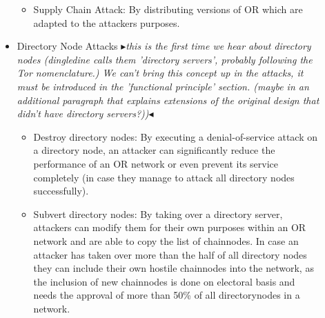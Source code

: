 \documentclass{sig-alternate}
\newcommand{\boxedtext}[1]{\fbox{\scriptsize\bfseries\textsf{#1}}}
\newcommand{\nota}[2]{
   \boxedtext{#1}
       {\small$\blacktriangleright$\emph{\textsl{#2}}$\blacktriangleleft$}
}
\newcommand\fk[1]{\nota{FK}{#1}}
\begin{document}
\begin{description}
\begin{itemize}
\begin{itemize}
			\item Supply Chain Attack: By distributing versions of OR which are adapted to the attackers purposes. 
		\end{itemize}
		\item Directory Node Attacks\fk{this is the first time we hear about directory nodes (dingledine calls them 'directory servers', probably following the Tor nomenclature.) We can't bring this concept up in the attacks, it must be introduced in the 'functional principle' section. (maybe in an additional paragraph that explains extensions of the original design that didn't have directory servers?))}
			\begin{itemize} \itemsep0pt 
			\item Destroy directory nodes: By executing a denial-of-service attack on a directory node, an attacker can significantly reduce the performance of an OR network or even prevent its service completely (in case they manage to attack all directory nodes successfully).
			\item Subvert directory nodes: By taking over a directory server, attackers can modify them for their own purposes within an OR network and are able to copy the list of chainnodes. In case an attacker has taken over more than the half of all directory nodes they can include their own hostile chainnodes into the network, as the inclusion of new chainnodes is done on electoral basis and needs the approval of more than 50\% of all directorynodes in a network.
		\end{itemize}
	\end{itemize}
\end{description}
\end{document}
